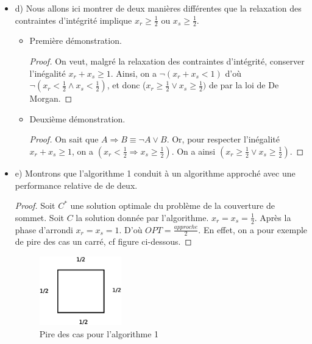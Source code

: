 \begin{itemize}
\begin{proof}
minimiser le nombre de sommets et le simplexe est adéquat. Le résultat
est donc absurde et contredit notre hypothèse de départ.
\end{proof}
\item[] d) Nous allons ici montrer de deux manières différentes que la
  relaxation des contraintes d'intégrité implique $x_r \geq
  \frac{1}{2}$ ou $x_s \geq \frac{1}{2}$.
\begin{itemize}
\item Première démonstration.
\begin{proof}
On veut, malgré la relaxation des contraintes d'intégrité, conserver
l'inégalité $x_r + x_s \geq 1$. Ainsi, on a $\neg (x_r + x_s < 1)$
d'où $\neg (x_r < \frac{1}{2} \wedge x_s < \frac{1}{2})$, et donc
($x_r \geq \frac{1}{2} \vee x_s \geq \frac{1}{2}) $ de par la loi de
De Morgan.
\end{proof}
\item Deuxième démonstration.
\begin{proof}
On sait que $A \Rightarrow B \equiv \neg A \vee B$. 
Or, pour respecter l'inégalité $x_r + x_s \geq 1$, on a $(x_r <
\frac{1}{2} \Rightarrow x_s \geq \frac{1}{2})$. On a ainsi $(x_r \geq
\frac{1}{2} \vee x_s \geq \frac{1}{2})$. 
\end{proof}
\end{itemize}
\item[] e) Montrons que l'algorithme 1 conduit à un algorithme
  approché avec une performance relative de de deux. 
\begin{proof}
Soit $C^{*}$ une solution optimale du problème de la couverture de
sommet. Soit $C$ la solution donnée par l'algorithme. 
$x_r=x_s=\frac{1}{2}$. Après la phase d'arrondi $x_r=x_s= 1$. D'où $
OPT = \frac{approche}{2}$.
En effet, on a pour exemple de pire des cas un carré, cf figure
ci-dessous.
\end{proof}

\begin{figure}
\begin{center}
\includegraphics[height=3cm]{../images/carre.eps}
\end{center}
\caption{Pire des cas pour l'algorithme 1}
\end{figure}


\end{itemize}
